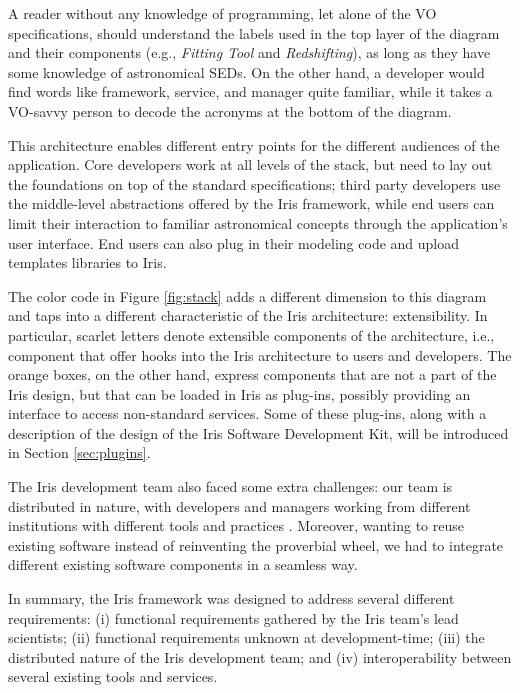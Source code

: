 \documentclass[final,5p,authoryear]{elsarticle}
\begin{document}
A reader without any knowledge of programming, let alone of the VO
specifications, should understand the labels used in the top layer of the
diagram and their components (e.g., \textit{Fitting Tool} and \textit{Redshifting}), as long as they
have some knowledge of astronomical SEDs. On the other hand, a developer would
find words like framework, service, and manager quite familiar, while it takes a
VO-savvy person to decode the acronyms at the bottom of the diagram.


This architecture enables different entry points for the different audiences of the
application. Core developers work at all levels of the stack, but need to lay
out the foundations on top of the standard specifications; third party
developers use the middle-level abstractions offered by the Iris framework,
while end users can limit their interaction to familiar astronomical concepts
through the application's user interface. End users can also plug in their
modeling code and upload templates libraries to Iris.

The color code in Figure \ref{fig:stack} adds a different dimension to this
diagram and taps into a different characteristic of the Iris architecture:
extensibility. In particular, scarlet letters denote extensible
components of the architecture, i.e., component that offer hooks into the Iris
architecture to users and developers. The orange boxes, on the other hand,
express components that are not a part of the Iris design, but that can be
loaded in Iris as plug-ins, possibly providing an interface to access
non-standard services. Some of these plug-ins, along with a description of the
design of the Iris Software Development Kit, will be introduced in Section
\ref{sec:plugins}.

The Iris development team also faced some extra challenges: our team is
distributed in nature, with developers and managers working from different
institutions with different tools and practices \citep{2012SPIE.8449E..0IE}.
Moreover, wanting to reuse existing software instead of reinventing the
proverbial wheel, we had to integrate different existing software components in
a seamless way.

In summary, the Iris framework was designed to address several different
requirements: (i) functional requirements gathered by the Iris team's lead
scientists; (ii) functional requirements unknown at development-time; (iii) the
distributed nature of the Iris development team; and (iv) interoperability between 
several existing tools and services.
\end{document}
